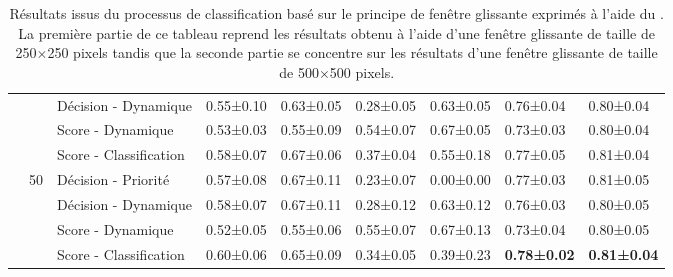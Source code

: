 \begin{landscape}
\begin{table}[]
\begin{tabular}{lllllllll}
							        &                                   & Décision - Dynamique                    & 0.55±0.10         & 0.63±0.05     & 0.28±0.05         & 0.63±0.05     & 0.76±0.04         & 0.80±0.04         \\
							        &                                   & Score - Dynamique               & 0.53±0.03         & 0.55±0.09     & 0.54±0.07         & 0.67±0.05     & 0.73±0.03         & 0.80±0.04         \\
							        &                                   & Score - Classification                    & 0.58±0.07         & 0.67±0.06     & 0.37±0.04         & 0.55±0.18     & 0.77±0.05         & 0.81±0.04         \\ \cline{2-9}
							        & \multirow{4}{*}{50}               & Décision - Priorité                    & 0.57±0.08         & 0.67±0.11     & 0.23±0.07         & 0.00±0.00     & 0.77±0.03         & 0.81±0.05         \\
							        &                                   & Décision - Dynamique                    & 0.58±0.07         & 0.67±0.11     & 0.28±0.12         & 0.63±0.12     & 0.76±0.03         & 0.80±0.05         \\
							        &                                   & Score - Dynamique               & 0.52±0.05         & 0.55±0.06     & 0.55±0.07         & 0.67±0.13     & 0.73±0.04         & 0.80±0.05         \\
		                            &                                   & Score - Classification                    & 0.60±0.06         & 0.65±0.09     & 0.34±0.05         & 0.39±0.23     & \textbf{0.78±0.02}& \textbf{0.81±0.04}\\
		\bottomrule
    \end{tabular}
    \caption{Résultats issus du processus de classification basé sur le principe de fenêtre glissante exprimés à l'aide du \fscore. La première partie de ce tableau reprend les résultats obtenu à l'aide d'une fenêtre glissante de taille de 250$\times$250 pixels tandis que la seconde partie se concentre sur les résultats d'une fenêtre glissante de taille de 500$\times$500 pixels.}
    \label{tab:results_image_improvement_sliding_window}
\end{table}
\end{landscape}

